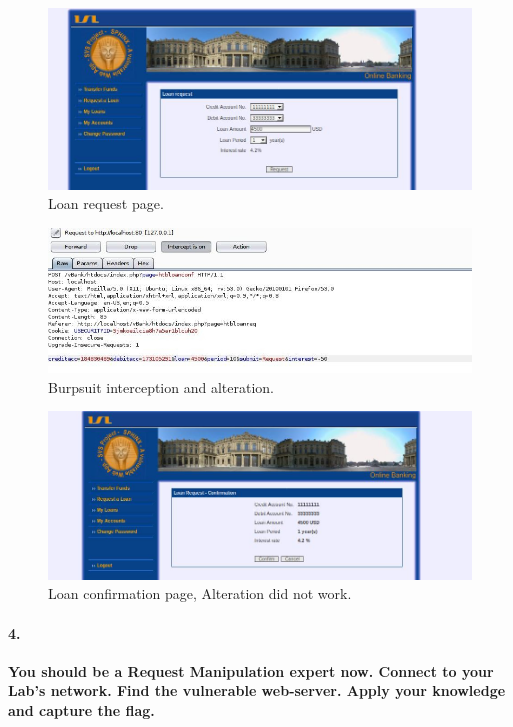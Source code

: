 \documentclass[12pt]{report}
\begin{document}
	\begin{figure}[H]
		\includegraphics[width=0.7\textheight,height=0.25\textheight]{images/1_3corrected1.jpg}
		\caption{Loan request page.}
	\end{figure}
	
	\begin{figure}[H]
		\includegraphics[width=0.7\textheight]{images/1_3corrected2.jpg}
		\caption{Burpsuit interception and alteration.}
	\end{figure}
	
	\begin{figure}[H]
		\includegraphics[width=0.7\textheight,height=0.25\textheight]{images/1_3corrected3.jpg}
		\caption{Loan confirmation page, Alteration did not work.}
	\end{figure}

	\paragraph*{4.}{\bf You should be a Request Manipulation expert now. Connect to your Lab's network. Find the vulnerable web-server. Apply your knowledge and capture the flag.}\\
	
\end{document}
